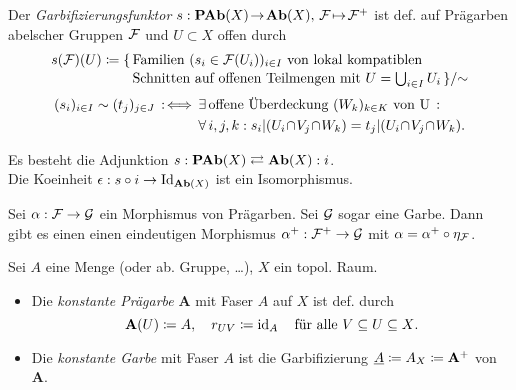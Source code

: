 \documentclass{cheat-sheet}
\begin{document}
\begin{defn}
  Der \emph{Garbifizierungsfunktor} $s : \mathbf{PAb}(X) \!\to\! \mathbf{Ab}(X), \, \mathcal{F} \!\mapsto\! \mathcal{F}^+$ ist def. auf Prägarben abelscher Gruppen $\mathcal{F}$ und $U \subset X$ offen durch
  \begin{align*}
    s(\Fais)(U) \coloneqq \{ \, & \text{Familien $(s_i \in \Fais(U_i))_{i \in I}$ von lokal kompatiblen} \\[-2pt]
     & \text{Schnitten auf offenen Teilmengen mit $U = {\bigcup}_{i \in I} \, U_i$} \, \} / {\sim}
  \end{align*}\vspace{-16pt}
  \begin{align*}
    (s_i)_{i \in I} \sim (t_j)_{j \in J} \!\! \coloniff \, & \ex{\text{offene Überdeckung $(W_k)_{k \in K}$ von U}} \\
    & \fa{i, j, k\!}\! s_i|(U_i \!\cap\! V_j \!\cap\! W_k) = t_j|(U_i \!\cap\! V_j \!\cap\! W_k).
  \end{align*}
\end{defn}

\begin{thm}
  Es besteht die Adjunktion \enspace $s : \mathbf{PAb}(X) \rightleftarrows \mathbf{Ab}(X) : i$. \\
  Die Koeinheit $\epsilon : s \circ i \to \operatorname{Id}_{\mathbf{Ab}(X)}$ ist ein Isomorphismus.
\end{thm}

\begin{bem}
  Sei $\alpha : \mathcal{F} \to \mathcal{G}$ ein Morphismus von Prägarben. Sei $\mathcal{G}$ sogar eine Garbe. Dann gibt es einen einen eindeutigen Morphismus $\alpha^+ : \mathcal{F}^+ \to \mathcal{G}$ mit $\alpha = \alpha^+ \circ \eta_{\mathcal{F}}$.
\end{bem}


\begin{defn}
  Sei $A$ eine Menge (oder ab. Gruppe, \ldots), $X$ ein topol. Raum.
  \begin{itemize}
    \item Die \emph{konstante Prägarbe} $\mathbf{A}$ mit Faser $A$ auf $X$ ist def. durch
    \[
      \mathbf{A}(U) \coloneqq A, \quad
      r_{UV} \coloneqq \operatorname{id}_A \quad
      \text{für alle $V \subseteq U \subseteq X$.}
    \]
    \item Die \emph{konstante Garbe} mit Faser $A$ ist die Garbifizierung $\underline{A} \coloneqq A_X \coloneqq \mathbf{A}^+$ von $\mathbf{A}$.
  \end{itemize}
\end{defn}
\end{document}
